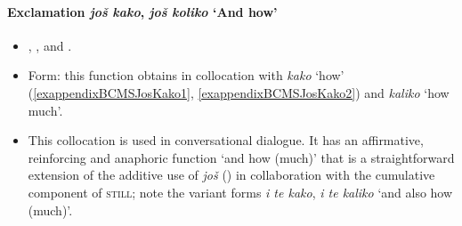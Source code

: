 \paragraph{Exclamation  \textit{još} \textit{kako}, \textit{još} \textit{koliko} \lq And how'}\label{appendixBCMSSpecificational}
\begin{itemize}
	\item \textcite[262]{JDahl1988}, \textcite{Prajnkovic2018}, and \textcite[s.v. \textit{još}]{HJP}.
	\item Form: this function obtains in collocation with \textit{kako} \lq how'
	(\ref{exappendixBCMSJosKako1}, \ref{exappendixBCMSJosKako2}) and \textit{kaliko} \lq how much'.
	\item This collocation is used in conversational dialogue. It has an affirmative, reinforcing and anaphoric function \lq and how (much)' that is a straightforward extension of the additive use of \textit{još} () in collaboration with the cumulative component of \textsc{still}; note the variant forms \textit{i te kako}, \textit{i te kaliko} \lq and also how (much)\rq{}.
\end{itemize}

